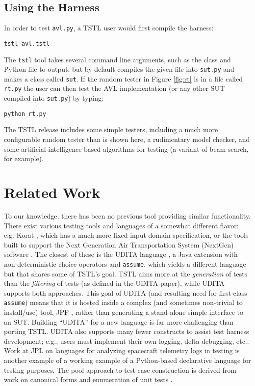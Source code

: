 \documentclass{sig-alternate}
\begin{document}
\subsection{Using the Harness}

In order to test {\tt avl.py},  a TSTL user would first compile the
harness:

\begin{verbatim}
tstl avl.tstl
\end{verbatim}

The {\tt tstl} tool takes several command line arguments, such as the
class and Python file to output, but by default compiles the given
file into {\tt sut.py} and makes a class called {\tt sut}.  If the
random tester in Figure \ref{fig:rt} is in a file called {\tt rt.py} the
user can then test the AVL implementation (or any other SUT compiled
into {\tt sut.py}) by typing:

\begin{verbatim}
python rt.py
\end{verbatim}

The TSTL release includes some simple testers, including a much more
configurable random tester than is shown here, a rudimentary model
checker, and some artificial-intelligence based algorithms for testing
(a variant of beam search, for example).

\section{Related Work}


To our knowledge, there has been no previous tool providing similar
functionality.  
There exist various testing tools and languages of a somewhat
different flavor: e.g. Korat \cite{Korat}, which has a much more fixed
input domain specification, or the tools built to support the Next
Generation Air Transportation System (NextGen) software
\cite{TameInputs}.  The closest of these is the UDITA language
\cite{UDITA}, a Java extension with non-deterministic choice
operators and {\tt assume}, which yields a different language but
that shares some of TSTL's goal.  TSTL aims more at the \emph{generation} of
tests than the \emph{filtering} of tests (as defined in the UDITA
paper), while UDITA supports both approaches.  This goal of UDITA (and
resulting need for first-class {\tt assume}) means that it is hosted
inside a complex (and sometimes non-trivial to install/use) tool, JPF
\cite{JPF2}, rather than generating a stand-alone simple interface to
an SUT.  Building ``UDITA'' for a new language is
far more challenging than porting TSTL.  UDITA also supports many fewer
constructs to assist test harness development; e.g., users must
implement their own logging, delta-debugging, etc..
Work at JPL on languages for analyzing spacecraft telemetry
logs in testing \cite{scriptstospecs} is another example of a working example of a
Python-based declarative language for testing purposes.  The pool
approach to test case construction is derived from work on canonical
forms and enumeration of unit tests \cite{AndrewsTR}.
\end{document}
